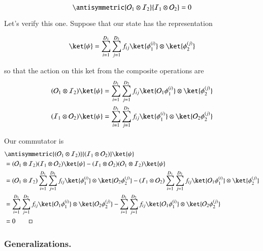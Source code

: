\begin{equation}\label{eqn:qmTwoL1:310}
\antisymmetric{ \mathcal{O}_1 \otimes \mathcal{I}_2 }{ \mathcal{I}_1 \otimes \mathcal{O}_2 } = 0
\end{equation}

Let's verify this one.  Suppose that our state has the representation

\begin{equation}\label{eqn:qmTwoL1:330}
\ket{\psi} 
= 
\sum_{i = 1}^{D_1}
\sum_{j = 1}^{D_2}
f_{ij}
\ket{ \phi_1^{(i)}} \otimes \ket{ \phi_2^{(j)}}
\end{equation}

so that the action on this ket from the composite operations are
\begin{align}\label{eqn:qmTwoL1:350}
(\mathcal{O}_1 \otimes \mathcal{I}_2)
\ket{\psi} 
&= 
\sum_{i = 1}^{D_1}
\sum_{j = 1}^{D_2}
f_{ij}
\ket{ \mathcal{O}_1 \phi_1^{(i)}} \otimes \ket{ \phi_2^{(j)}} \\
(\mathcal{I}_1 \otimes \mathcal{O}_2)
\ket{\psi} 
&= 
\sum_{i = 1}^{D_1}
\sum_{j = 1}^{D_2}
f_{ij}
\ket{ \phi_1^{(i)}} \otimes \ket{ \mathcal{O}_2 \phi_2^{(j)}}
\end{align}

Our commutator is
\begin{align*}
&\antisymmetric{(\mathcal{O}_1 \otimes \mathcal{I}_2)}{(\mathcal{I}_1 \otimes \mathcal{O}_2)}
\ket{\psi} \\
&=
(\mathcal{O}_1 \otimes \mathcal{I}_2)(\mathcal{I}_1 \otimes \mathcal{O}_2) 
\ket{\psi} 
-(\mathcal{I}_1 \otimes \mathcal{O}_2)(\mathcal{O}_1 \otimes \mathcal{I}_2)
\ket{\psi}  \\
&=
(\mathcal{O}_1 \otimes \mathcal{I}_2)
\sum_{i = 1}^{D_1}
\sum_{j = 1}^{D_2}
f_{ij}
\ket{ \phi_1^{(i)}} \otimes \ket{ \mathcal{O}_2 \phi_2^{(j)}}
-(\mathcal{I}_1 \otimes \mathcal{O}_2)
\sum_{i = 1}^{D_1}
\sum_{j = 1}^{D_2}
f_{ij}
\ket{ \mathcal{O}_1 \phi_1^{(i)}} \otimes \ket{ \phi_2^{(j)}} \\
&=
\sum_{i = 1}^{D_1}
\sum_{j = 1}^{D_2}
f_{ij}
\ket{ \mathcal{O}_1 \phi_1^{(i)}} \otimes \ket{ \mathcal{O}_2 \phi_2^{(j)}}
-
\sum_{i = 1}^{D_1}
\sum_{j = 1}^{D_2}
f_{ij}
\ket{ \mathcal{O}_1 \phi_1^{(i)}} \otimes \ket{ \mathcal{O}_2 \phi_2^{(j)}} \\
&=
0 \qquad \square
\end{align*}

\subsubsection{Generalizations.}

